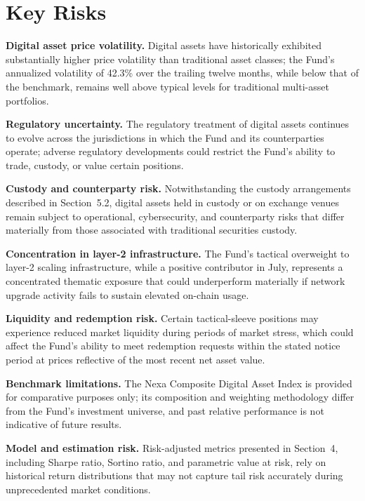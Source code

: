 \section{Key Risks}

\small
\begin{riskitem}
\item \textbf{Digital asset price volatility.} Digital assets have historically exhibited substantially higher price volatility than traditional asset classes; the Fund's annualized volatility of 42.3\% over the trailing twelve months, while below that of the benchmark, remains well above typical levels for traditional multi-asset portfolios.
\item \textbf{Regulatory uncertainty.} The regulatory treatment of digital assets continues to evolve across the jurisdictions in which the Fund and its counterparties operate; adverse regulatory developments could restrict the Fund's ability to trade, custody, or value certain positions.
\item \textbf{Custody and counterparty risk.} Notwithstanding the custody arrangements described in Section~5.2, digital assets held in custody or on exchange venues remain subject to operational, cybersecurity, and counterparty risks that differ materially from those associated with traditional securities custody.
\item \textbf{Concentration in layer-2 infrastructure.} The Fund's tactical overweight to layer-2 scaling infrastructure, while a positive contributor in July, represents a concentrated thematic exposure that could underperform materially if network upgrade activity fails to sustain elevated on-chain usage.
\item \textbf{Liquidity and redemption risk.} Certain tactical-sleeve positions may experience reduced market liquidity during periods of market stress, which could affect the Fund's ability to meet redemption requests within the stated notice period at prices reflective of the most recent net asset value.
\item \textbf{Benchmark limitations.} The Nexa Composite Digital Asset Index is provided for comparative purposes only; its composition and weighting methodology differ from the Fund's investment universe, and past relative performance is not indicative of future results.
\item \textbf{Model and estimation risk.} Risk-adjusted metrics presented in Section~4, including Sharpe ratio, Sortino ratio, and parametric value at risk, rely on historical return distributions that may not capture tail risk accurately during unprecedented market conditions.
\end{riskitem}

